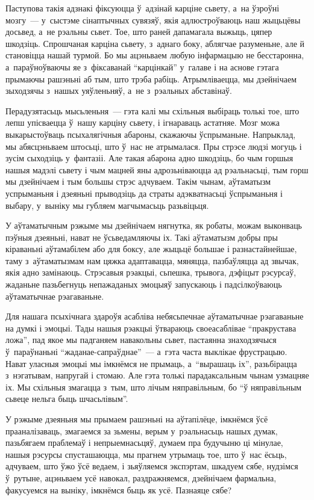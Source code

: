 Паступова такія адзнакі фіксуюцца ў~адзінай карціне сьвету, а~на ўзроўні мозгу~--- у~сыстэме сінаптычных сувязяў, якія адлюстроўваюць наш жыцьцёвы досьвед, а~не рэальны сьвет. Тое, што раней дапамагала выжыць, цяпер шкодзіць. Спрошчаная карціна сьвету, з~аднаго боку, аблягчае разуменьне, але й становіцца нашай турмой. Бо мы ацэньваем любую інфармацыю не бесстаронна, а~параўноўваючы яе з~фіксаванай ``карцінкай'' у~галаве і на аснове гэтага прымаючы рашэньні аб тым, што трэба рабіць. Атрымліваецца, мы дзейнічаем зыходзячы з~нашых уяўленьняў, а~не з~рэальных абставінаў.

Перадузятасьць мысьленьня~--- гэта калі мы схільныя выбіраць толькі тое, што лепш упісваецца ў~нашу карціну сьвету, і ігнараваць астатняе. Мозг можа выкарыстоўваць псыхалягічныя абароны, скажаючы ўспрыманьне. Напрыклад, мы абясцэньваем штосьці, што ў~нас не атрымалася. Пры стрэсе людзі могуць і зусім сыходзіць у~фантазіі. Але такая абарона адно шкодзіць, бо чым горшыя нашыя мадэлі сьвету і чым мацней яны адрозьніваюцца ад рэальнасьці, тым горш мы дзейнічаем і тым большы стрэс адчуваем. Такім чынам, аўтаматызм успрыманьня і дзеяньні прыводзіць да страты адэкватнасьці ўспрыманьня і выбару, у~выніку мы губляем магчымасьць разьвіцьця.

У аўтаматычным рэжыме мы дзейнічаем нягнутка, як робаты, можам выконваць пэўныя дзеяньні, нават не ўсьведамляючы іх. Такі аўтаматызм добры пры кіраваньні аўтамабілем або для боксу, але жыцьцё большае і разнастайнейшае, таму з~аўтаматызмам нам цяжка адаптавацца, мяняцца, пазбаўляцца ад звычак, якія адно замінаюць. Стрэсавыя рэакцыі, сьпешка, трывога, дэфіцыт рэсурсаў, жаданьне пазьбегнуць непажаданых эмоцыяў запускаюць і падсілкоўваюць аўтаматычнае рэагаваньне.

Для нашага псыхічнага здароўя асабліва небясьпечнае аўтаматычнае рэагаваньне на думкі і эмоцыі. Тады нашыя рэакцыі ўтвараюць своеасаблівае ``пракрустава ложа'', пад якое мы падганяем навакольны сьвет, пастаянна знаходзячыся ў~параўнаньні ``жаданае-сапраўднае''~--- а~гэта часта выклікае фрустрацыю. Нават уласныя эмоцыі мы імкнёмся не прымаць, а~``вырашаць іх'', разьбірацца з~нэгатывам, напругай і стомаю. Але гэта толькі парадаксальным чынам узмацняе іх. Мы схільныя змагацца з~тым, што лічым няправільным, бо ``ў няправільным сьвеце нельга быць шчасьлівым''.

У рэжыме дзеяньня мы прымаем рашэньні на аўтапілёце, імкнёмся ўсё прааналізаваць, змагаемся за зьмены, верым у~рэальнасьць нашых думак, пазьбягаем праблемаў і непрыемнасьцяў, думаем пра будучыню ці мінулае, нашыя рэсурсы спусташаюцца, мы прагнем утрымаць тое, што ў~нас ёсьць, адчуваем, што ўжо ўсё ведаем, і зьяўляемся экспэртам, шкадуем сябе, нудзімся ў~рутыне, ацэньваем усё навокал, раздражняемся, дзейнічаем фармальна, факусуемся на выніку, імкнёмся быць як усё. Пазнаяце сябе?

